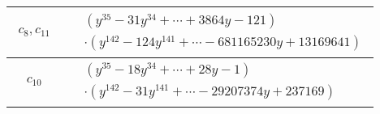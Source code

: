 \documentclass[1p]{elsarticle_modified}
\theoremstyle{definition}
\begin{document}
\begin{tabular}{m{50pt}|m{274pt}}
\hline $$\begin{aligned}c_{8},c_{11}\end{aligned}$$&$\begin{aligned}
&(y^{35}-31 y^{34}+\cdots+3864 y-121)\\
&\cdot(y^{142}-124 y^{141}+\cdots-681165230 y+13169641)
\end{aligned}$\\
\hline $$\begin{aligned}c_{10}\end{aligned}$$&$\begin{aligned}
&(y^{35}-18 y^{34}+\cdots+28 y-1)\\
&\cdot(y^{142}-31 y^{141}+\cdots-29207374 y+237169)
\end{aligned}$\\
\hline
\end{tabular}
\vskip 2pc
\end{document}

